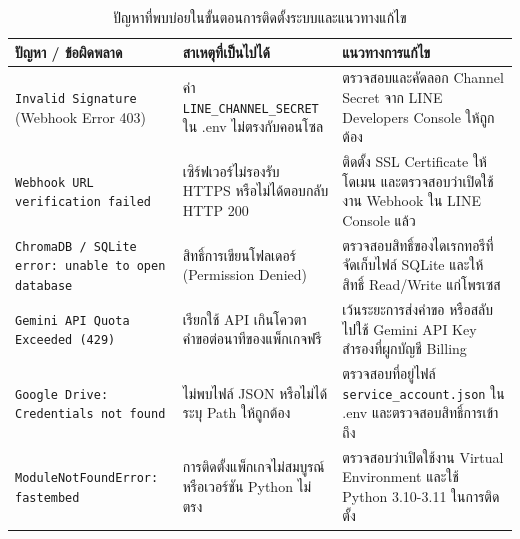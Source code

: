 \begin{table}[htbp]
\centering
\caption{ปัญหาที่พบบ่อยในขั้นตอนการติดตั้งระบบและแนวทางแก้ไข}
\label{tabA:troubleshooting}
\begin{tabularx}{\textwidth}{| L | L | L |}
\hline
\textbf{ปัญหา / ข้อผิดพลาด} & \textbf{สาเหตุที่เป็นไปได้} & \textbf{แนวทางการแก้ไข} \\ \hline
\texttt{Invalid Signature} (Webhook Error 403) & ค่า \texttt{LINE\_CHANNEL\_SECRET} ใน .env ไม่ตรงกับคอนโซล & ตรวจสอบและคัดลอก Channel Secret จาก LINE Developers Console ให้ถูกต้อง \\ \hline
\texttt{Webhook URL verification failed} & เซิร์ฟเวอร์ไม่รองรับ HTTPS หรือไม่ได้ตอบกลับ HTTP 200 & ติดตั้ง SSL Certificate ให้โดเมน และตรวจสอบว่าเปิดใช้งาน Webhook ใน LINE Console แล้ว \\ \hline
\texttt{ChromaDB / SQLite error: unable to open database} & สิทธิ์การเขียนโฟลเดอร์ (Permission Denied) & ตรวจสอบสิทธิ์ของไดเรกทอรีที่จัดเก็บไฟล์ SQLite และให้สิทธิ์ Read/Write แก่โพรเซส \\ \hline
\texttt{Gemini API Quota Exceeded (429)} & เรียกใช้ API เกินโควตาคำขอต่อนาทีของแพ็กเกจฟรี & เว้นระยะการส่งคำขอ หรือสลับไปใช้ Gemini API Key สำรองที่ผูกบัญชี Billing \\ \hline
\texttt{Google Drive: Credentials not found} & ไม่พบไฟล์ JSON หรือไม่ได้ระบุ Path ให้ถูกต้อง & ตรวจสอบที่อยู่ไฟล์ \texttt{service\_account.json} ใน .env และตรวจสอบสิทธิ์การเข้าถึง \\ \hline
\texttt{ModuleNotFoundError: fastembed} & การติดตั้งแพ็กเกจไม่สมบูรณ์ หรือเวอร์ชัน Python ไม่ตรง & ตรวจสอบว่าเปิดใช้งาน Virtual Environment และใช้ Python 3.10-3.11 ในการติดตั้ง \\ \hline
\end{tabularx}
\end{table}

